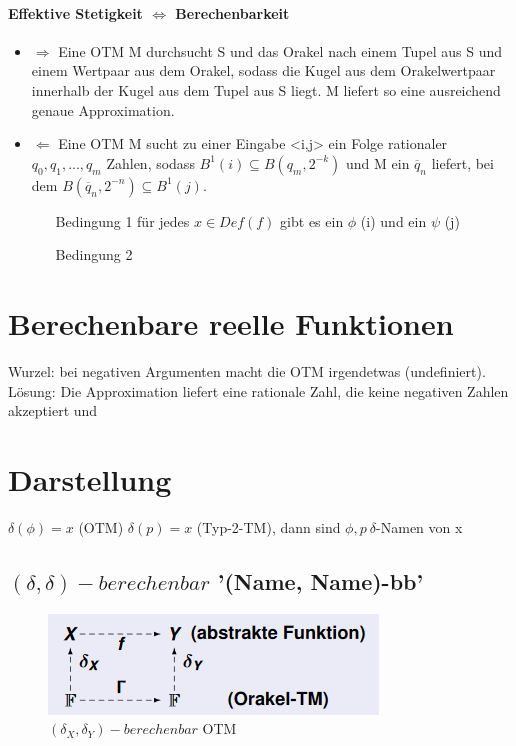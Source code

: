 \documentclass[ngerman]{scrartcl}
\begin{document}
\paragraph{Effektive Stetigkeit $ \Leftrightarrow $ Berechenbarkeit}
\begin{itemize}
  \item $ \Rightarrow $ Eine OTM M durchsucht S und das Orakel nach einem Tupel aus S und einem Wertpaar aus dem Orakel, sodass die Kugel aus dem Orakelwertpaar innerhalb der Kugel aus dem Tupel aus S liegt. M liefert so eine ausreichend genaue Approximation.
  \item $ \Leftarrow $ Eine OTM M sucht zu einer Eingabe <i,j> ein Folge rationaler $ q_0,q_1,...,q_m$ Zahlen, sodass $ B^1(i) \subseteq B(q_m, 2^{-k}) $ und M ein $ \overline{q}_n $ liefert, bei dem $ B(\overline{q}_n, 2^{-n}) \subseteq B^1(j)$.
  \begin{itemize}
    \item[Bedingung 1] für jedes $ x\in Def(f)$ gibt es ein $\phi$ (i) und ein $\psi$ (j)
    \item[Bedingung 2]
  \end{itemize}

\end{itemize}


%
%
\section{Berechenbare reelle Funktionen}
Wurzel: bei negativen Argumenten macht die OTM irgendetwas (undefiniert). Lösung: Die Approximation liefert eine rationale Zahl, die keine negativen Zahlen akzeptiert und


%
%
\section{Darstellung}

$ \delta(\phi) = x $ (OTM) $\delta(p) = x $ (Typ-2-TM), dann sind $ \phi, p\ \delta$-Namen von x

\subsection{$ (\delta, \delta)-berechenbar $ '(Name, Name)-bb'}
\begin{figure}[h]
  \centering
  \includegraphics{orakelname.PNG}
  \caption{$ (\delta_X, \delta_Y)-berechenbar$ OTM}
\end{figure}
\end{document}
